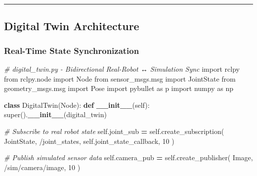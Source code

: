 \documentclass[
]{article}
\newenvironment{Shaded}{\begin{snugshade}}{\end{snugshade}}
\newcommand{\BuiltInTok}[1]{#1}
\newcommand{\CommentTok}[1]{\textcolor[rgb]{0.56,0.35,0.01}{\textit{#1}}}
\newcommand{\DecValTok}[1]{\textcolor[rgb]{0.00,0.00,0.81}{#1}}
\newcommand{\FunctionTok}[1]{\textcolor[rgb]{0.13,0.29,0.53}{\textbf{#1}}}
\newcommand{\ImportTok}[1]{#1}
\newcommand{\KeywordTok}[1]{\textcolor[rgb]{0.13,0.29,0.53}{\textbf{#1}}}
\newcommand{\NormalTok}[1]{#1}
\newcommand{\OperatorTok}[1]{\textcolor[rgb]{0.81,0.36,0.00}{\textbf{#1}}}
\newcommand{\StringTok}[1]{\textcolor[rgb]{0.31,0.60,0.02}{#1}}
\newcommand{\VariableTok}[1]{\textcolor[rgb]{0.00,0.00,0.00}{#1}}
\begin{document}
\begin{center}\rule{0.5\linewidth}{0.5pt}\end{center}

\hypertarget{digital-twin-architecture}{%
\subsection{Digital Twin Architecture}\label{digital-twin-architecture}}

\hypertarget{real-time-state-synchronization}{%
\subsubsection{Real-Time State
Synchronization}\label{real-time-state-synchronization}}

\begin{Shaded}
\begin{Highlighting}[]
\CommentTok{\# digital\_twin.py {-} Bidirectional Real{-}Robot ↔ Simulation Sync}
\ImportTok{import}\NormalTok{ rclpy}
\ImportTok{from}\NormalTok{ rclpy.node }\ImportTok{import}\NormalTok{ Node}
\ImportTok{from}\NormalTok{ sensor\_msgs.msg }\ImportTok{import}\NormalTok{ JointState}
\ImportTok{from}\NormalTok{ geometry\_msgs.msg }\ImportTok{import}\NormalTok{ Pose}
\ImportTok{import}\NormalTok{ pybullet }\ImportTok{as}\NormalTok{ p}
\ImportTok{import}\NormalTok{ numpy }\ImportTok{as}\NormalTok{ np}

\KeywordTok{class}\NormalTok{ DigitalTwin(Node):}
    \KeywordTok{def} \FunctionTok{\_\_init\_\_}\NormalTok{(}\VariableTok{self}\NormalTok{):}
        \BuiltInTok{super}\NormalTok{().}\FunctionTok{\_\_init\_\_}\NormalTok{(}\StringTok{\textquotesingle{}digital\_twin\textquotesingle{}}\NormalTok{)}

        \CommentTok{\# Subscribe to real robot state}
        \VariableTok{self}\NormalTok{.joint\_sub }\OperatorTok{=} \VariableTok{self}\NormalTok{.create\_subscription(}
\NormalTok{            JointState,}
            \StringTok{\textquotesingle{}/joint\_states\textquotesingle{}}\NormalTok{,}
            \VariableTok{self}\NormalTok{.joint\_state\_callback,}
            \DecValTok{10}
\NormalTok{        )}

        \CommentTok{\# Publish simulated sensor data}
        \VariableTok{self}\NormalTok{.camera\_pub }\OperatorTok{=} \VariableTok{self}\NormalTok{.create\_publisher(}
\NormalTok{            Image,}
            \StringTok{\textquotesingle{}/sim/camera/image\textquotesingle{}}\NormalTok{,}
            \DecValTok{10}
\NormalTok{        )}


\end{Highlighting}
\end{Shaded}
\end{document}
